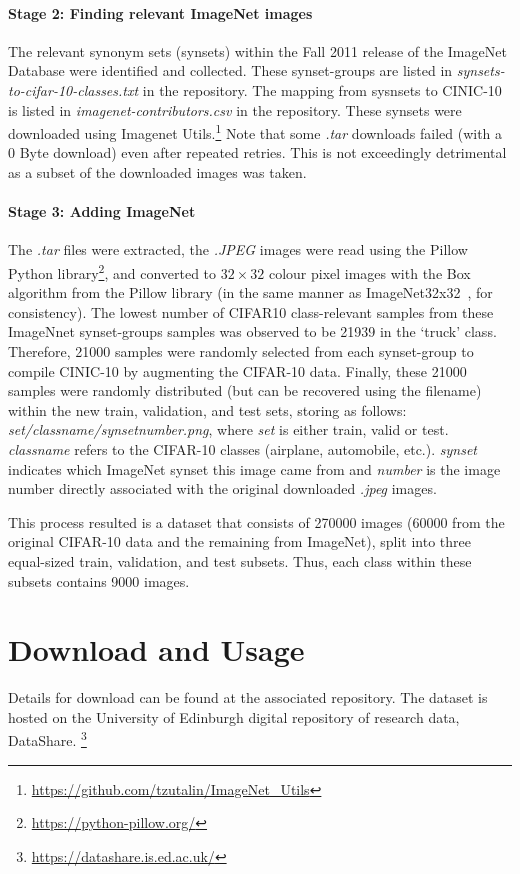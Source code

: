 \documentclass[coverpage]{Style/inftechrep}
\begin{document}
\paragraph{Stage 2: Finding relevant ImageNet images} 
The relevant synonym sets (synsets) within the Fall 2011 release of the ImageNet Database were identified and collected. These synset-groups are listed in \textit{synsets-to-cifar-10-classes.txt} in the repository. The mapping from sysnsets to CINIC-10 is listed in \textit{imagenet-contributors.csv} in the repository. These synsets were downloaded using Imagenet Utils.\footnote{\url{https://github.com/tzutalin/ImageNet_Utils}} Note that some \textit{.tar} downloads failed (with a 0 Byte download) even after repeated retries. This is not exceedingly detrimental as a subset of the downloaded images was taken.

\paragraph{Stage 3: Adding ImageNet} 
The \textit{.tar} files were extracted, the \textit{.JPEG} images were read using the Pillow Python library\footnote{\url{https://python-pillow.org/}}, and converted to $32\times 32$ colour pixel images with the Box algorithm from the Pillow library (in the same manner as ImageNet32x32~\citep{imagenet32}, for consistency). The lowest number of CIFAR10 class-relevant samples from these ImageNnet synset-groups samples was observed to be 21939 in the `truck' class. Therefore, 21000 samples were randomly selected from each synset-group to compile CINIC-10 by augmenting the CIFAR-10 data. Finally, these 21000 samples were randomly distributed (but can be recovered using the filename) within the new train, validation, and test sets, storing as follows: {\it set/classname/synsetnumber.png}, where {\it set} is either train, valid or test. {\it classname} refers to the CIFAR-10 classes (airplane, automobile, etc.). {\it synset} indicates which ImageNet synset this image came from and {\it number} is the image number directly associated with the original downloaded \textit{.jpeg} images.

This process resulted is a dataset that consists of 270000 images (60000 from the original CIFAR-10 data and the remaining from ImageNet), split into three equal-sized train, validation, and test subsets. Thus, each class within these subsets contains 9000 images.

\section{Download and Usage}
Details for download can be found at the associated repository. The dataset is hosted on the University of Edinburgh digital repository of research data, DataShare. \footnote{\url{https://datashare.is.ed.ac.uk/}}
\end{document}
